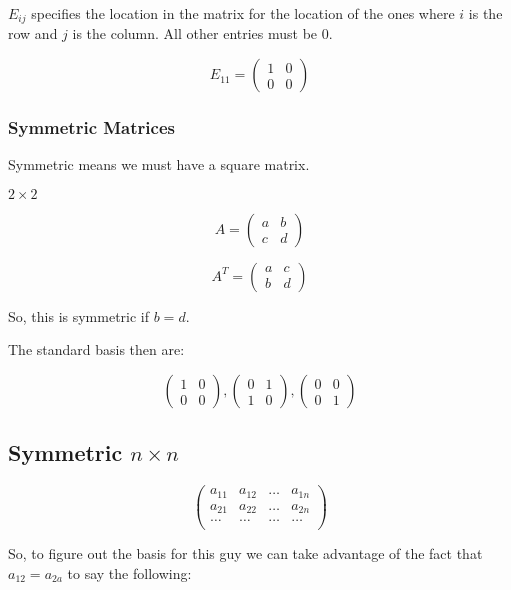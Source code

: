 \documentclass[a4paper]{article}
\begin{document}
$E_{ij}$ specifies the location in the matrix for the location of the ones where $i$ is the row and $j$ is the column. All other entries must be 0.

\[
	E_{11} = 
	\begin{pmatrix}
		1 & 0 \\
		0 & 0
	\end{pmatrix}
\]

\subsubsection*{Symmetric Matrices}

Symmetric means we must have a square matrix.

$2 \times 2$

\[
A = 
\begin{pmatrix}
	a & b \\
	c & d
\end{pmatrix}
\]

\[
A^T = 
\begin{pmatrix}
	a & c \\
	b & d
\end{pmatrix}
\]

So, this is symmetric if $b = d$.

The standard basis then are:

\[
	\begin{pmatrix}
		1 & 0 \\
		0 & 0
	\end{pmatrix},
	\begin{pmatrix}
		0 & 1 \\
		1 & 0
	\end{pmatrix},
	\begin{pmatrix}
		0 & 0 \\
		0 & 1
	\end{pmatrix}
\]

\subsection*{Symmetric $n \times n$}

\[
	\begin{pmatrix}
		a_{11} & a_{12}  & \dots & a_{1n} \\
		a_{21} & a_{22} & \dots & a_{2n} \\
		\dots & \dots & \dots & \dots \\
	\end{pmatrix}
\]

So, to figure out the basis for this guy we can take advantage of the fact that $a_{12} = a_{2a}$ to say the following:
\end{document}

